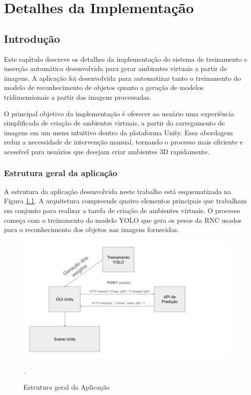 \chapter{Detalhes da Implementação}

\section{Introdução}

Este capítulo descreve os detalhes da implementação do sistema de treinamento e inserção automática desenvolvida para gerar ambientes virtuais a partir de imagens. A aplicação foi desenvolvida para automatizar tanto o treinamento do modelo de reconhecimento de objetos quanto a geração de modelos tridimensionais a partir das imagens processadas.

O principal objetivo da implementação é oferecer ao usuário uma experiência simplificada de criação de ambientes virtuais, a partir do carregamento de imagens em um menu intuitivo dentro da plataforma Unity. Essa abordagem reduz a necessidade de intervenção manual, tornando o processo mais eficiente e acessível para usuários que desejam criar ambientes 3D rapidamente.

\subsection{Estrutura geral da aplicação}

A estrutura da aplicação desenvolvida neste trabalho está esquematizada na Figura \ref{fig:estrutura}. A arquitetura compreende quatro elementos principais que trabalham em conjunto para realizar a tarefa de criação de ambientes virtuais. O processo começa com o treinamento do modelo YOLO que gera os pesos da RNC usados para o reconhecimento dos objetos nas imagens fornecidas.

\begin{figure}[!h]
    \centering
    \begin{minipage}{1\linewidth}
    \centering
    \captionsetup{justification=centering,margin=0.5cm,font=small}
    \includegraphics[width=1\linewidth]{img/cap5/estrutura.jpg}
    \caption{Estrutura geral da Aplicação}.
    \label{fig:estrutura}
    \end{minipage}
\end{figure}

